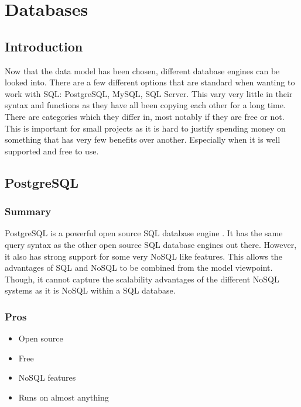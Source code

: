 \documentclass[draftclsnofoot,onecolumn,journal,letterpaper,compsoc,10pt]{IEEEtran}
\begin{document}
\section{Databases}

    \subsection{Introduction}
    
    Now that the data model has been chosen, different database engines can be looked into.  There are a few different options that are standard when wanting to work with SQL: PostgreSQL, MySQL, SQL Server.  This vary very little in their syntax and functions as they have all been copying each other for a long time.  There are categories which they differ in, most notably if they are free or not.  This is important for small projects as it is hard to justify spending money on something that has very few benefits over another.  Especially when it is well supported and free to use.
    
    \subsection{PostgreSQL}
    
        \subsubsection{Summary}
        
        PostgreSQL is a powerful open source SQL database engine \cite{postgresql}.  It has the same query syntax as the other open source SQL database engines out there.  However, it also has strong support for some very NoSQL like features.  This allows the advantages of SQL and NoSQL to be combined from the model viewpoint.  Though, it cannot capture the scalability advantages of the different NoSQL systems as it is NoSQL within a SQL database.
        
        \subsubsection{Pros}
        \begin{itemize}
            \item Open source
            \item Free
            \item NoSQL features
            \item Runs on almost anything \cite{db_comparison}
        \end{itemize}
        
\end{document}
